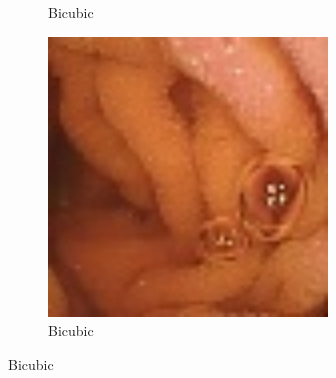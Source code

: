 \begin{figure}[H]
\begin{subfigure}[b]{0.32\textwidth}
    \caption{Bicubic}
  \end{subfigure}
  \begin{subfigure}[b]{0.32\textwidth}
    \includegraphics[width=\textwidth]{Chapter7/Bicubic_456.jpg}
    \caption{Bicubic}
  \end{subfigure}
  

\end{figure}
